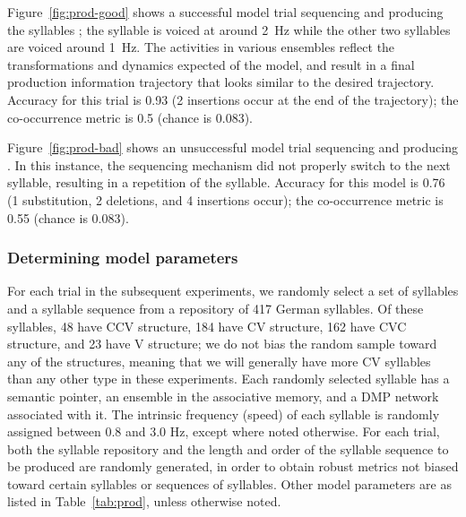 Figure~\ref{fig:prod-good} shows
a successful model trial
sequencing and producing the syllables
;
the \ipa{[ti]} syllable is voiced
at around 2~Hz while the other
two syllables are voiced around 1~Hz.
The activities in various ensembles
reflect the transformations
and dynamics expected of the model,
and result in a final
production information trajectory
that looks similar
to the desired trajectory.
Accuracy for this trial is 0.93
(2 insertions occur at the end of the trajectory);
the co-occurrence metric is 0.5
(chance is 0.083).



Figure~\ref{fig:prod-bad}
shows an unsuccessful model trial
sequencing and producing
.
In this instance,
the sequencing mechanism did not properly
switch to the next syllable,
resulting in a repetition of the
\ipa{[ti]} syllable.
Accuracy for this model is 0.76
(1 substitution, 2 deletions, and 4 insertions occur);
the co-occurrence metric is 0.55
(chance is 0.083).

\subsubsection{Determining model parameters}

For each trial in the subsequent experiments,
we randomly select a set of syllables
and a syllable sequence
from a repository of 417 German syllables.
Of these syllables,
48 have CCV structure,
184 have CV structure,
162 have CVC structure,
and 23 have V structure;
we do not bias the random sample
toward any of the structures,
meaning that we will generally
have more CV syllables
than any other type in these experiments.
Each randomly selected syllable
has a semantic pointer,
an ensemble in the associative memory,
and a DMP network associated with it.
The intrinsic frequency (speed)
of each syllable is randomly assigned
between 0.8 and 3.0 Hz,
except where noted otherwise.
For each trial,
both the syllable repository
and the length and order
of the syllable sequence
to be produced are randomly generated,
in order to obtain robust metrics
not biased toward certain syllables
or sequences of syllables.
Other model parameters are as listed in
Table~\ref{tab:prod},
unless otherwise noted.

